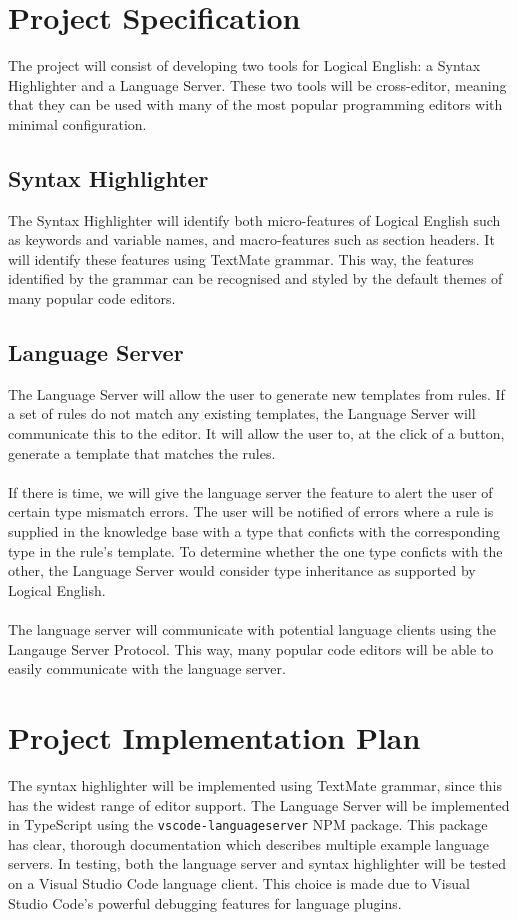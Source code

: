\documentclass[../main.tex]{subfiles}
\begin{document}
\section*{Project Specification}
The project will consist of developing two tools for Logical English: a Syntax Highlighter and a Language Server. These two tools will be cross-editor, meaning that they can be used with many of the most popular programming editors with minimal configuration.

\subsection*{Syntax Highlighter}
The Syntax Highlighter will identify both micro-features of Logical English such as keywords and variable names, and macro-features such as section headers. It will identify these features using TextMate grammar. This way, the features identified by the grammar can be recognised and styled by the default themes of many popular code editors. 

\subsection*{Language Server}
The Language Server will allow the user to generate new templates from rules. If a set of rules do not match any existing templates, the Language Server will communicate this to the editor. It will allow the user to, at the click of a button, generate a template that matches the rules. 
\\ \\ 
If there is time, we will give the language server the feature to alert the user of certain type mismatch errors. The user will be notified of errors where a rule is supplied in the knowledge base with a type that conficts with the corresponding type in the rule's template. To determine whether the one type conficts with the other, the Language Server would consider type inheritance as supported by Logical English.
\\ \\
The language server will communicate with potential language clients using the Langauge Server Protocol. This way, many popular code editors will be able to easily communicate with the language server.

\section*{Project Implementation Plan}
The syntax highlighter will be implemented using TextMate grammar, since this has the widest range of editor support.  The Language Server will be implemented in TypeScript using the \texttt{vscode-languageserver} NPM package. This package has clear, thorough documentation which describes multiple example language servers. In testing, both the language server and syntax highlighter will be tested on a Visual Studio Code language client. This choice is made due to Visual Studio Code's powerful debugging features for language plugins.
\end{document}
